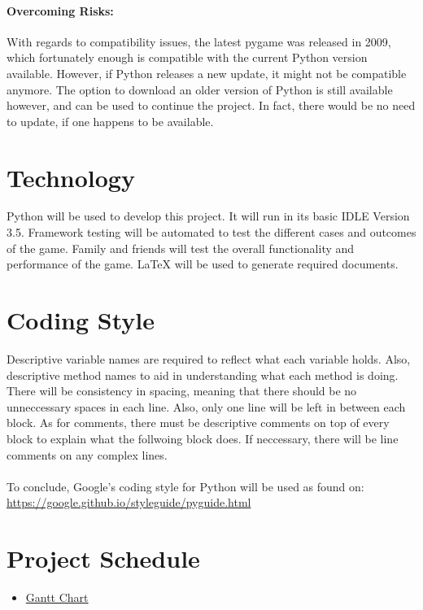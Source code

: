 \documentclass{article}
\begin{document}
\paragraph{Overcoming Risks:}
With regards to compatibility issues, the latest pygame was released in 2009, which fortunately enough is compatible with the current Python version available. However, if Python releases a new update, it might not be compatible anymore. The option to download an older version of Python is still available however, and can be used to continue the project. In fact, there would be no need to update, if one happens to be available.

\section{Technology}
Python will be used to develop this project. It will run in its basic IDLE Version 3.5. Framework testing will be automated to test the different cases and outcomes of the game. Family and friends will test the overall functionality and performance of the game. LaTeX will be used to generate required documents.

\section{Coding Style}
Descriptive variable names are required to reflect what each variable holds. Also, descriptive method names to aid in understanding what each method is doing. There will be consistency in spacing, meaning that there should be no unneccessary spaces in each line. Also, only one line will be left in between each block. As for comments, there must be descriptive comments on top of every block to explain what the follwoing block does. If neccessary, there will be line comments on any complex lines.\\
\\
To conclude, Google's coding style for Python will be used as found on: \url{https://google.github.io/styleguide/pyguide.html}

\section{Project Schedule}

\begin{itemize}

\item \href{run:GanttChart.gan} {Gantt Chart}

\end{itemize}
\end{document}
